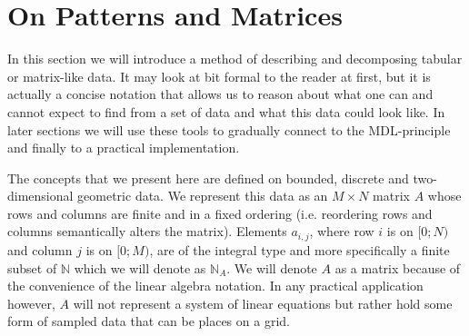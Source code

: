 \documentclass{llncs}
\begin{document}
\section{On Patterns and Matrices}

In this section we will introduce a method of describing and decomposing tabular or matrix-like data. It may look at bit formal to the reader at first, but it is actually a concise notation that allows us to reason about what one can and cannot expect to find from a set of data and what this data could look like. In later sections we will use these tools to gradually connect to the MDL-principle and finally to a practical implementation.

The concepts that we present here are defined on bounded, discrete and two-dimensional geometric data. We represent this data as an $M\times N$ matrix $A$ whose rows and columns are finite and in a fixed ordering (i.e. reordering rows and columns semantically alters the matrix). Elements $a_{i,j}$, where row $i$ is on $[0;N)$ and column $j$ is on $[0;M)$, are of the integral type and more specifically a finite subset of $\mathbb{N}$ which we will denote as $\mathbb{N}_A$. We will denote $A$ as a matrix because of the convenience of the linear algebra notation. In any practical application however, $A$ will not represent a system of linear equations but rather hold some form of sampled data that can be places on a grid.

\end{document}
